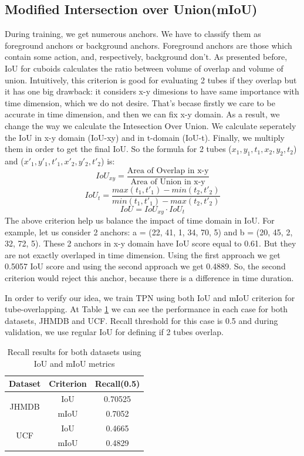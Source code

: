 \subsection{Modified Intersection over Union(mIoU)} 
During training, we get numerous anchors. We have to classify them as foreground anchors or
background anchors. Foreground anchors are those which contain some action, and, respectively, background
don't. As presented before, IoU for cuboids calculates the ratio between volume of overlap and volume of
union.
Intuitively, this criterion is good for evaluating 2 tubes if they overlap but it has one big drawback:
it considers x-y dimesions to have same importance with time dimension, which we do not desire. That's becase
firstly we care to be accurate in time dimension, and then we can fix x-y domain.
As a result, we change the way we calculate the Intesection Over Union. We calculate seperately
the IoU in x-y domain (IoU-xy) and in t-domain (IoU-t). Finally, we multiply them in order to get the final IoU.
So the formula for 2 tubes ($x_1, y_1, t_1, x_2, y_2, t_2$) and ($x'_1, y'_1, t'_1, x'_2, y'_2, t'_2$) is:
\[ IoU_{xy} = \frac{ \text{Area of Overlap in x-y}} { \text{Area of Union in x-y}}  \]
\[ IoU_t = \frac { max(t_1, t'_1) - min(t_2, t'_2)} {min(t_1,t'_1) - max(t_2,t'_2)} \]
\[ IoU = IoU_{xy} \cdot  IoU_t \]
The above criterion help us balance the impact of time domain in IoU. For example, let us consider 2 anchors:
a = (22, 41, 1, 34, 70, 5) and b = (20, 45, 2, 32, 72, 5). These 2 anchors in x-y domain have IoU score equal to 0.61.
But they are not exactly overlaped in time dimension. Using the first approach we get 0.5057 IoU score and using the
second approach we get 0.4889. So, the second criterion would reject this anchor, because there is a difference in time
duration.  \par

In order to verify our idea, we train TPN using both IoU and mIoU criterion for tube-overlapping. At Table \ref{table:iou_miou}
we can see the performance in each case for both datasets, JHMDB and UCF. Recall threshold for this case is 0.5 and during validation,
we use regular IoU for defining if 2 tubes overlap.
\begin{table}[h]
\centering
  \begin{tabular}{|| c | c || c ||}
    \hline
    \textbf{Dataset} & \textbf{Criterion} & \textbf{Recall(0.5)} \\
    \hline  \hline
    \multirow{2}{4em}{JHMDB} & IoU & 0.70525 \\
    \cline{2-3}
    {} & mIoU & 0.7052 \\
    \hline
    \multirow{2}{4em}{UCF} & IoU & 0.4665 \\
    \cline{2-3}
    {} & mIoU & 0.4829 \\
    \hline      
  \end{tabular}
  \caption{Recall results for both datasets using IoU and mIoU metrics}
  \label{table:iou_miou}
\end{table}

